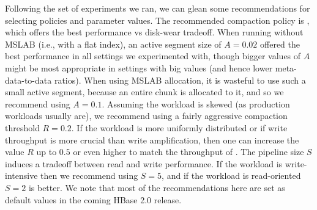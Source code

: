  Following the set of experiments we ran, we can glean some recommendations 
for selecting policies and parameter values.
The recommended compaction policy is \adp, which offers the best performance vs disk-wear tradeoff.
When running without MSLAB (i.e., with a flat index), 
an active segment size of $A=0.02$ offered the best performance in all settings we experimented with, though bigger values of $A$ might be most appropriate in settings with big values (and hence lower meta-data-to-data ratios). 
When using MSLAB allocation, it is wasteful to use such a small active segment, because an entire chunk is allocated to it, and 
so we recommend using $A=0.1$.
Assuming the workload is skewed (as production workloads usually are), we recommend using a fairly aggressive compaction threshold $R=0.2$. If the workload is more uniformly distributed or if write throughput is more crucial than write amplification, then one can increase the value $R$ up to $0.5$ or even higher to match the throughput of \basic. 
The pipeline size $S$ induces a tradeoff between read and write performance.
If the workload is write-intensive then we recommend using $S=5$, and if the workload is read-oriented  $S=2$ is better.
We note that most of the recommendations here are set as default values in the coming HBase 2.0 release.
